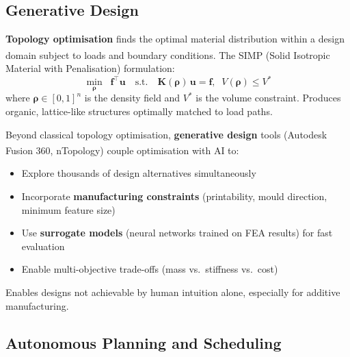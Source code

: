 \subsection{Generative Design}

\begin{tcbitemize}[ skin=sectionraster ]
    \tcbitem[title={Topology Optimisation}, raster multicolumn=3]
    \textbf{Topology optimisation} finds the optimal material distribution within a design domain subject to loads and boundary conditions\textsuperscript{\cite[][pp.~1549--1551]{sigristTopologyOptimizationReview2021}}.
    The SIMP (Solid Isotropic Material with Penalisation) formulation:
    \begin{equation}
        \min_{\boldsymbol{\rho}} \;\; \mathbf{f}^\top \mathbf{u} \quad \text{s.t.} \quad \mathbf{K}(\boldsymbol{\rho})\,\mathbf{u} = \mathbf{f},\;\; V(\boldsymbol{\rho}) \leq V^*
    \end{equation}
    where $\boldsymbol{\rho} \in [0,1]^n$ is the density field and $V^*$ is the volume constraint.
    Produces organic, lattice-like structures optimally matched to load paths.

    \tcbitem[title={AI-Driven Design Exploration}, raster multicolumn=3]
    Beyond classical topology optimisation, \textbf{generative design} tools (Autodesk Fusion 360, nTopology) couple optimisation with AI to\textsuperscript{\cite[][pp.~1560--1565]{sigristTopologyOptimizationReview2021}}:
    \begin{itemize}
        \item Explore thousands of design alternatives simultaneously
        \item Incorporate \textbf{manufacturing constraints} (printability, mould direction, minimum feature size)
        \item Use \textbf{surrogate models} (neural networks trained on FEA results) for fast evaluation
        \item Enable multi-objective trade-offs (mass vs.\ stiffness vs.\ cost)
    \end{itemize}
    Enables designs not achievable by human intuition alone, especially for additive manufacturing.
\end{tcbitemize}

\subsection{Autonomous Planning and Scheduling}

